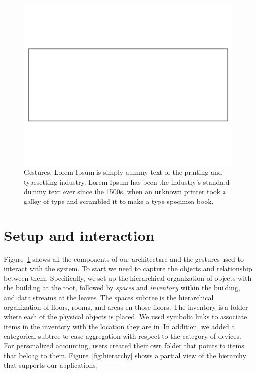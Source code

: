 \begin{figure}[htb!]
\begin{center}
\includegraphics[scale=0.5]{figs/blankrectangle}
\caption{Gestures. Lorem Ipsum is simply dummy text of the printing and typesetting industry. Lorem Ipsum has 
been the industry's standard dummy text ever since the 1500s, when an unknown printer took a galley of 
type and scrambled it to make a type specimen book.  }
\label{fig:gestures}
\end{center}
\end{figure}

\section{Setup and interaction}
Figure~\ref{fig:gestures} shows all the components of our architecture and the gestures used to interact with the system.  To
start we need to capture the objects and relationship between them.  Specifically, we set up the hierarchical organization of
objects with the building at the root, followed by \emph{spaces} and \emph{inventory} within the building, and data streams at the leaves.
The spaces subtree is the hierarchical organization of floors, rooms, and areas on those floors.  The inventory is a folder where
each of the physical objects is placed.  We used symbolic links to associate items in the inventory with the location
they are in.  In addition, we added a categorical subtree to ease aggregation with respect to the category of devices.
For personalized accounting, users created their own folder that points to items that belong to them.
Figure~\ref{fig:hierarchy} shows a partial view of the hierarchy that supports our applications.

